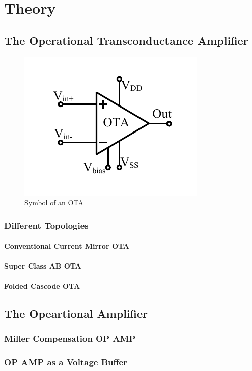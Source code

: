 \chapter{Theory}
\section{The Operational Transconductance Amplifier}

\begin{figure} [H]
\centering
\includegraphics[scale=1]{Figures/System_Level/OTA_Symbol.pdf}
\caption{Symbol of an OTA}
\end{figure}


\subsection{Different Topologies}
\subsubsection{Conventional Current Mirror OTA}
\subsubsection{Super Class AB OTA}
\subsubsection{Folded Cascode OTA}
\section{The Opeartional Amplifier}
\subsection{Miller Compensation OP AMP}
\subsection{OP AMP as a Voltage Buffer}
